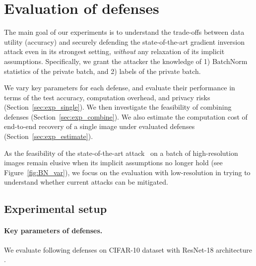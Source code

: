 \section{Evaluation of defenses}
\label{sec:exp}

The main goal of our experiments is to understand the trade-offs between data utility (accuracy) and securely defending the state-of-the-art gradient inversion attack even in its strongest setting, \textit{without} any relaxation of its implicit assumptions. Specifically, we grant the attacker the knowledge of 1) BatchNorm statistics of the private batch, and 2) labels of the private batch. 

We vary key parameters for each defense, and evaluate their performance in terms of the test accuracy, computation overhead, and privacy risks (Section~\ref{sec:exp_single}). We then investigate the feasibility of combining defenses (Section~\ref{sec:exp_combine}). We also estimate the computation cost of end-to-end recovery of a single image under evaluated defenses (Section~\ref{sec:exp_estimate}).

As the feasibility of the state-of-the-art attack~\citep{geiping2020inverting} on a batch of high-resolution images remain elusive when its implicit assumptions no longer hold (see Figure~\ref{fig:BN_var}), we focus on the evaluation with low-resolution in trying to understand whether current attacks can be mitigated.


\subsection{Experimental setup} 
\label{sec:exp_setup}

\paragraph{Key parameters of defenses.} We evaluate following defenses on CIFAR-10 dataset \citep{cifar10} with ResNet-18 architecture \citep{he2015resnet}. 

